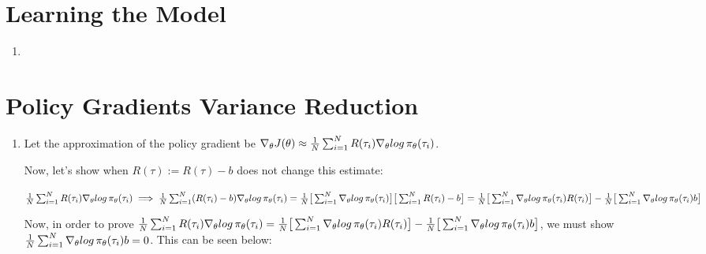\documentclass[11pt,english]{article}
\begin{document}
\section{Learning the Model}

\begin{enumerate}
	\item 
\end{enumerate}

\section{Policy Gradients Variance Reduction}

\begin{enumerate}
	\item Let the approximation of the policy gradient be $\nabla_\theta J(\theta) \approx \frac{1}{N}\sum_{i=1}^N R(\tau_i)\nabla_\theta log\thinspace \pi_\theta (\tau_i)$.
	
	Now, let's show when $R(\tau) := R(\tau) - b$ does not change this estimate:
	
	$\frac{1}{N}\sum_{i=1}^N R(\tau_i)\nabla_\theta log\thinspace \pi_\theta (\tau_i)\\
	\implies \frac{1}{N}\sum_{i=1}^N (R(\tau_i) - b)\nabla_\theta log\thinspace \pi_\theta (\tau_i)\\
	= \frac{1}{N}\big[\sum_{i=1}^N \nabla_\theta log\thinspace \pi_\theta (\tau_i)\big] \big[\sum_{i=1}^N R(\tau_i) - b\big]\\
	= \frac{1}{N}\big[\sum_{i=1}^N \nabla_\theta log\thinspace \pi_\theta (\tau_i) R(\tau_i)\big] - \frac{1}{N}\big[\sum_{i=1}^N \nabla_\theta log\thinspace \pi_\theta (\tau_i) b\big]$
	
	Now, in order to prove $\frac{1}{N}\sum_{i=1}^N R(\tau_i)\nabla_\theta log\thinspace \pi_\theta (\tau_i) = \frac{1}{N}\big[\sum_{i=1}^N \nabla_\theta log\thinspace \pi_\theta (\tau_i) R(\tau_i)\big] - \frac{1}{N}\big[\sum_{i=1}^N \nabla_\theta log\thinspace \pi_\theta (\tau_i) b\big]$, we must show $\frac{1}{N}\sum_{i=1}^N \nabla_\theta log\thinspace \pi_\theta (\tau_i) b = 0$. This can be seen below:
	

\end{enumerate}
\end{document}
